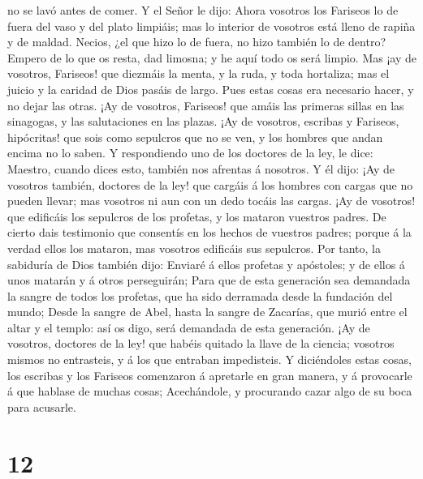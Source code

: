 no se lavó antes de comer.  Y el Señor le dijo: Ahora
vosotros los Fariseos lo de fuera del vaso y del plato limpiáis; mas lo
interior de vosotros está lleno de rapiña y de maldad. 
Necios, ¿el que hizo lo de fuera, no hizo también lo de dentro?
 Empero de lo que os resta, dad limosna; y he aquí todo
os será limpio.  Mas ¡ay de vosotros, Fariseos! que
diezmáis la menta, y la ruda, y toda hortaliza; mas el juicio y la
caridad de Dios pasáis de largo. Pues estas cosas era necesario hacer, y
no dejar las otras.  ¡Ay de vosotros, Fariseos! que amáis
las primeras sillas en las sinagogas, y las salutaciones en las plazas.
 ¡Ay de vosotros, escribas y Fariseos, hipócritas! que
sois como sepulcros que no se ven, y los hombres que andan encima no lo
saben.  Y respondiendo uno de los doctores de la ley, le
dice: Maestro, cuando dices esto, también nos afrentas á nosotros.
 Y él dijo: ¡Ay de vosotros también, doctores de la ley!
que cargáis á los hombres con cargas que no pueden llevar; mas vosotros
ni aun con un dedo tocáis las cargas.  ¡Ay de vosotros!
que edificáis los sepulcros de los profetas, y los mataron vuestros
padres.  De cierto dais testimonio que consentís en los
hechos de vuestros padres; porque á la verdad ellos los mataron, mas
vosotros edificáis sus sepulcros.  Por tanto, la
sabiduría de Dios también dijo: Enviaré á ellos profetas y apóstoles; y
de ellos á unos matarán y á otros perseguirán;  Para que
de esta generación sea demandada la sangre de todos los profetas, que ha
sido derramada desde la fundación del mundo;  Desde la
sangre de Abel, hasta la sangre de Zacarías, que murió entre el altar y
el templo: así os digo, será demandada de esta generación.
 ¡Ay de vosotros, doctores de la ley! que habéis quitado
la llave de la ciencia; vosotros mismos no entrasteis, y á los que
entraban impedisteis.  Y diciéndoles estas cosas, los
escribas y los Fariseos comenzaron á apretarle en gran manera, y á
provocarle á que hablase de muchas cosas;  Acechándole, y
procurando cazar algo de su boca para acusarle.

\hypertarget{section-11}{%
\section{12}\label{section-11}}

